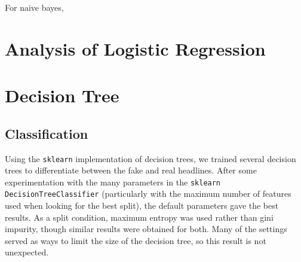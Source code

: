 \documentclass{article}
\begin{document}
   For naive bayes,



   \section{Analysis of Logistic Regression}



   \section{Decision Tree}
   \subsection{Classification}
   Using the \texttt{sklearn} implementation of decision trees, we trained several decision trees
   to differentiate between the fake and real headlines. After some experimentation with the many parameters
   in the \texttt{sklearn DecisionTreeClassifier} (particularly with the maximum number of features used
   when looking for the best split), the default parameters gave the best results. As a split condition,
   maximum entropy was used rather than gini impurity, though similar results were obtained for both.
   Many of the settings served as ways to limit the size of the decision tree, so this result is not unexpected.
\end{document}
